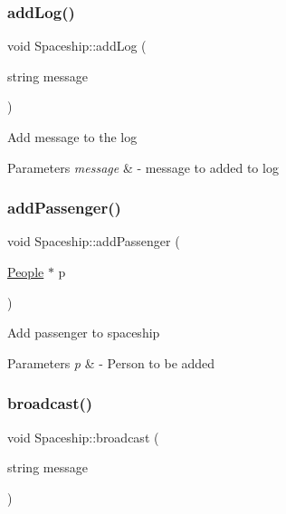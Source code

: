 \mbox{\label{classSpaceship_acf25a335848231435a64a484c103dfcb}} 
\subsubsection{\texorpdfstring{add\+Log()}{addLog()}}
{\footnotesize\ttfamily void Spaceship\+::add\+Log (\begin{DoxyParamCaption}\item[{string}]{message }\end{DoxyParamCaption})}

Add message to the log 
\begin{DoxyParams}{Parameters}
{\em message} & -\/ message to added to log \\
\hline
\end{DoxyParams}
\mbox{\label{classSpaceship_a67b7e60d2dc77e740309a9d994d653a1}} 
\subsubsection{\texorpdfstring{add\+Passenger()}{addPassenger()}}
{\footnotesize\ttfamily void Spaceship\+::add\+Passenger (\begin{DoxyParamCaption}\item[{\hyperlink{classPeople}{People} $\ast$}]{p }\end{DoxyParamCaption})\hspace{0.3cm}{\ttfamily [virtual]}}

Add passenger to spaceship 
\begin{DoxyParams}{Parameters}
{\em p} & -\/ Person to be added \\
\hline
\end{DoxyParams}
\mbox{\label{classSpaceship_a6539b155cc0dc525c506eee788fe9449}} 
\subsubsection{\texorpdfstring{broadcast()}{broadcast()}}
{\footnotesize\ttfamily void Spaceship\+::broadcast (\begin{DoxyParamCaption}\item[{string}]{message }\end{DoxyParamCaption})}

